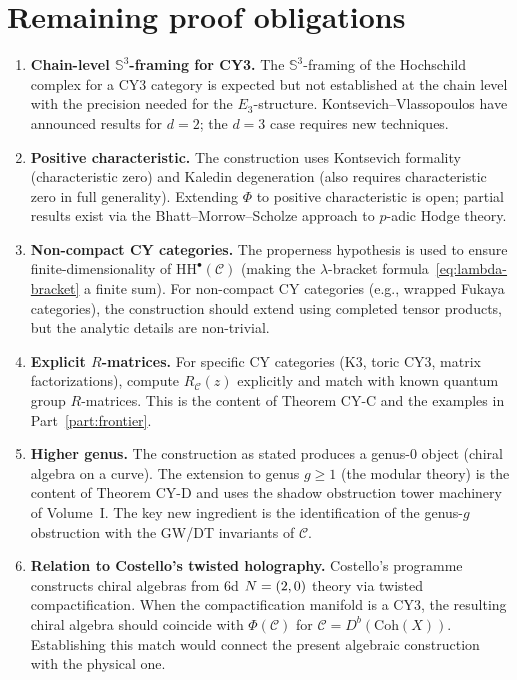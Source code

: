 \documentclass[11pt]{article}
\theoremstyle{plain}
\theoremstyle{definition}
\theoremstyle{remark}
\newcommand{\HH}{\mathrm{HH}}
\newcommand{\Coh}{\mathrm{Coh}}
\newcommand{\cC}{\mathcal{C}}
\begin{document}
\section{Remaining proof obligations}
\label{sec:open}

\begin{enumerate}[label=\textbf{O\arabic*.}]
\item \textbf{Chain-level $\mathbb{S}^3$-framing for CY3.}\; The $\mathbb{S}^3$-framing of the Hochschild complex for a CY3 category is expected but not established at the chain level with the precision needed for the $E_3$-structure. Kontsevich--Vlassopoulos have announced results for $d = 2$; the $d = 3$ case requires new techniques.

\item \textbf{Positive characteristic.}\; The construction uses Kontsevich formality (characteristic zero) and Kaledin degeneration (also requires characteristic zero in full generality). Extending $\Phi$ to positive characteristic is open; partial results exist via the Bhatt--Morrow--Scholze approach to $p$-adic Hodge theory.

\item \textbf{Non-compact CY categories.}\; The properness hypothesis is used to ensure finite-dimensionality of $\HH^\bullet(\cC)$ (making the $\lambda$-bracket formula~\eqref{eq:lambda-bracket} a finite sum). For non-compact CY categories (e.g., wrapped Fukaya categories), the construction should extend using completed tensor products, but the analytic details are non-trivial.

\item \textbf{Explicit $R$-matrices.}\; For specific CY categories (K3, toric CY3, matrix factorizations), compute $R_\cC(z)$ explicitly and match with known quantum group $R$-matrices. This is the content of Theorem CY-C and the examples in Part~\ref{part:frontier}.

\item \textbf{Higher genus.}\; The construction as stated produces a genus-0 object (chiral algebra on a curve). The extension to genus $g \geq 1$ (the modular theory) is the content of Theorem CY-D and uses the shadow obstruction tower machinery of Volume~I. The key new ingredient is the identification of the genus-$g$ obstruction with the GW/DT invariants of $\cC$.

\item \textbf{Relation to Costello's twisted holography.}\; Costello's programme constructs chiral algebras from 6d $N = (2,0)$ theory via twisted compactification. When the compactification manifold is a CY3, the resulting chiral algebra should coincide with $\Phi(\cC)$ for $\cC = D^b(\Coh(X))$. Establishing this match would connect the present algebraic construction with the physical one.
\end{enumerate}
\end{document}
